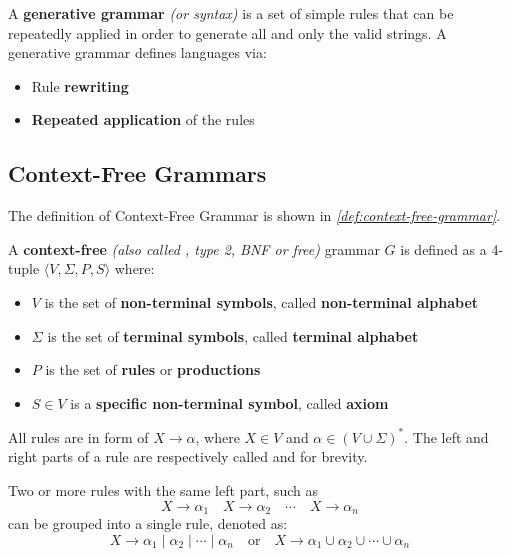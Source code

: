 \documentclass[english]{article}
\begin{document}
A \textbf{generative grammar} \textit{(or syntax)} is a set of simple rules that can be repeatedly applied in order to generate all and only the valid strings.
A generative grammar defines languages via:

\begin{itemize}
  \item Rule \textbf{rewriting}
  \item \textbf{Repeated application} of the rules
\end{itemize}

\subsection{Context-Free Grammars}

The definition of Context-Free Grammar is shown in \textit{\ref{def:context-free-grammar}}.

\begin{definition}
  \label{def:context-free-grammar}
  A \textbf{context-free} \textit{(also called \CF, type 2, BNF or free)} grammar \(G\) is defined as a 4-tuple \(\langle V, \Sigma, P, S\rangle\) where:

  \begin{itemize}
    \item \(V\) is the set of \textbf{non-terminal symbols}, called \textbf{non-terminal alphabet}
    \item \(\Sigma\) is the set of \textbf{terminal symbols}, called \textbf{terminal alphabet}
    \item \(P\) is the set of \textbf{rules} or \textbf{productions}
    \item \(S \in V\) is a \textbf{specific non-terminal symbol}, called \textbf{axiom}
  \end{itemize}

  All rules are in form of \(X \rightarrow \alpha\), where \(X \in V\) and \(\alpha \in (V \cup \Sigma)^\ast\).
  The left and right parts of a rule are respectively called \textbf{\LP} and \textbf{\RP} for brevity.
\end{definition}

Two or more rules with the same left part, such as
\[ X \rightarrow \alpha_1 \quad X \rightarrow \alpha_2\quad \cdots \quad X \rightarrow \alpha_n \]
can be grouped into a single rule, denoted as:
\[ X \rightarrow \alpha_1 \mid \alpha_2 \mid \cdots  \mid \alpha_n \quad \text{or} \quad X \rightarrow \alpha_1 \cup \alpha_2 \cup \cdots \cup \alpha_n \]
\end{document}
